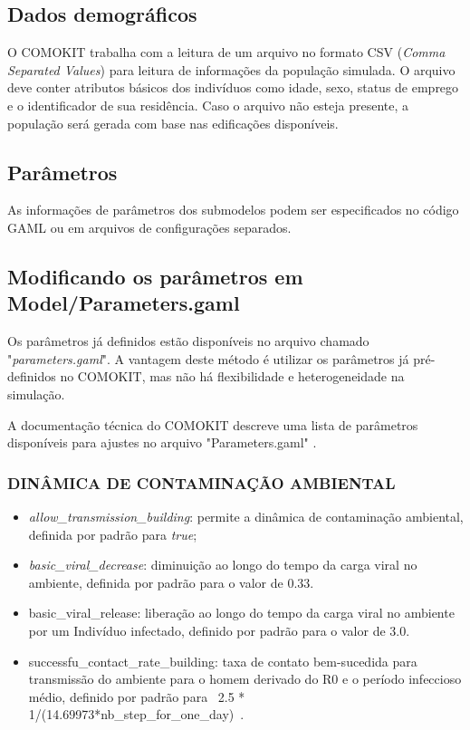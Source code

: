 \subsection{Dados demográficos}

O COMOKIT trabalha com a leitura de um arquivo no formato CSV (\textit{Comma Separated Values}) para leitura de informações da população simulada. O arquivo deve conter atributos básicos dos indivíduos como idade, sexo, status de emprego e o identificador de sua residência. Caso o arquivo não esteja presente, a população será gerada com base nas edificações disponíveis.


\subsection{Parâmetros}

As informações de parâmetros dos submodelos podem ser especificados no código
GAML ou em arquivos de configurações separados.

\subsection{Modificando os parâmetros em Model/Parameters.gaml}

Os parâmetros já definidos estão disponíveis no arquivo chamado "\textit{parameters.gaml}". A vantagem deste método é utilizar os parâmetros já pré-definidos no COMOKIT, mas não há flexibilidade e heterogeneidade na simulação.

A documentação técnica do COMOKIT descreve uma lista de parâmetros disponíveis para ajustes no arquivo "Parameters.gaml" \cite{ParametrosCOMOKIT:online}.

\subsubsection{DINÂMICA DE CONTAMINAÇÃO AMBIENTAL}

\begin{itemize}
\item \textit{allow\_transmission\_building}: permite a dinâmica de contaminação ambiental, definida por padrão para \textit{true};
\item \textit{basic\_viral\_decrease}: diminuição ao longo do tempo da carga viral no ambiente, definida por padrão para o valor de 0.33.
\item {basic\_viral\_release}: liberação ao longo do tempo da carga viral no ambiente por um Indivíduo infectado, definido por padrão para o valor de 3.0.
\item {successfu\_contact\_rate\_building}: taxa de contato bem-sucedida para transmissão do ambiente para o homem derivado do R0 e o período infeccioso médio, definido por padrão para \ 2.5 * 1/(14.69973*{nb\_step\_for\_one\_day})\ .
\end{itemize}

